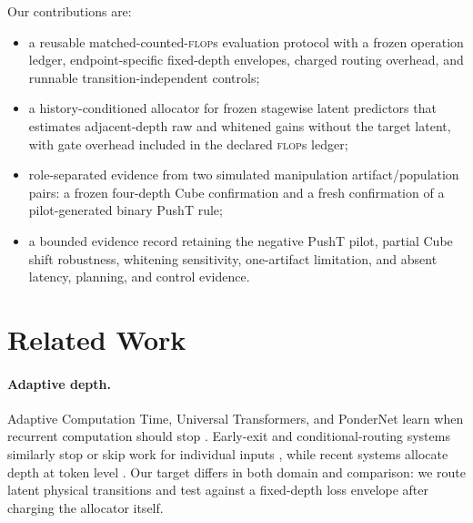 \documentclass{article}
\newcommand{\flops}{\textsc{flop}s}
\begin{document}
Our contributions are:
\begin{itemize}
  \item a reusable matched-counted-\flops{} evaluation protocol with a frozen operation ledger, endpoint-specific fixed-depth envelopes, charged routing overhead, and runnable transition-independent controls;
  \item a history-conditioned allocator for frozen stagewise latent predictors that estimates adjacent-depth raw and whitened gains without the target latent, with gate overhead included in the declared \flops{} ledger;
  \item role-separated evidence from two simulated manipulation artifact/population pairs: a frozen four-depth Cube confirmation and a fresh confirmation of a pilot-generated binary PushT rule;
  \item a bounded evidence record retaining the negative PushT pilot, partial Cube shift robustness, whitening sensitivity, one-artifact limitation, and absent latency, planning, and control evidence.
\end{itemize}

\section{Related Work}

\paragraph{Adaptive depth.}
Adaptive Computation Time, Universal Transformers, and PonderNet learn when recurrent computation should stop \citep{graves2016adaptive,dehghani2019universal,banino2021pondernet}. Early-exit and conditional-routing systems similarly stop or skip work for individual inputs \citep{teerapittayanon2016branchynet,bolukbasi2017adaptive,wang2018skipnet,wu2018blockdrop}, while recent systems allocate depth at token level \citep{raposo2024mixture,bae2025mixture}. Our target differs in both domain and comparison: we route latent physical transitions and test against a fixed-depth loss envelope after charging the allocator itself.
\end{document}
